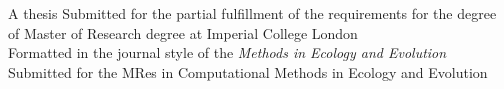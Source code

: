\begin{titlepage}
\makeatletter
\@date 
\makeatother

\vfill %
A thesis Submitted for the partial fulfillment of the requirements for the degree of Master of Research degree at Imperial College London\\[0.5cm]
Formatted in the journal style of the {\it Methods in Ecology and Evolution}\\[0.5cm]
Submitted for the MRes in Computational Methods in Ecology and Evolution

\end{titlepage}
